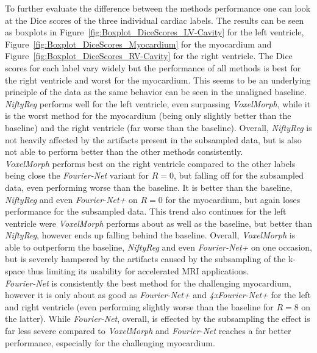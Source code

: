 \documentclass[english,version-2022-01]{uzl-thesis} %
\begin{document}
To further evaluate the difference between the methods performance one can look at the Dice scores of the three individual cardiac labels. The results can be seen as boxplots in Figure~\ref{fig:Boxplot_DiceScores_LV-Cavity} for the left ventricle, Figure~\ref{fig:Boxplot_DiceScores_Myocardium} for the myocardium and Figure~\ref{fig:Boxplot_DiceScores_RV-Cavity} for the right ventricle.
The Dice scores for each label vary widely but the performance of all methods is best for the right ventricle and worst for the myocardium. This seems to be an underlying principle of the data as the same behavior can be seen in the unaligned baseline. \\
\emph{NiftyReg} performs well for the left ventricle, even surpassing \emph{VoxelMorph}, while it is the worst method for the myocardium (being only slightly better than the baseline) and the right ventricle (far worse than the baseline). Overall, \emph{NiftyReg} is not heavily affected by the artifacts present in the subsampled data, but is also not able to perform better than the other methods consistently. \\
\emph{VoxelMorph} performs best on the right ventricle compared to the other labels being close the \emph{Fourier-Net} variant for $R=0$, but falling off for the subsampled data, even performing worse than the baseline. It is better than the baseline, \emph{NiftyReg} and even \emph{Fourier-Net+} on $R=0$ for the myocardium, but again loses performance for the subsampled data. This trend also continues for the left ventricle were \emph{VoxelMorph} performs about as well as the baseline, but better than \emph{NiftyReg}, however ends up falling behind the baseline. Overall, \emph{VoxelMorph} is able to outperform the baseline, \emph{NiftyReg} and even \emph{Fourier-Net+} on one occasion, but is severely hampered by the artifacts caused by the subsampling of the k-space thus limiting its usability for accelerated MRI applications.\\
\emph{Fourier-Net} is consistently the best method for the challenging myocardium, however it is only about as good as \emph{Fourier-Net+} and \emph{4xFourier-Net+} for the left and right ventricle (even performing slightly worse than the baseline for $R=8$ on the latter). While \emph{Fourier-Net}, overall, is effected by the subsampling the effect is far less severe compared to \emph{VoxelMorph} and \emph{Fourier-Net} reaches a far better performance, especially for the challenging myocardium.\\
\end{document}
